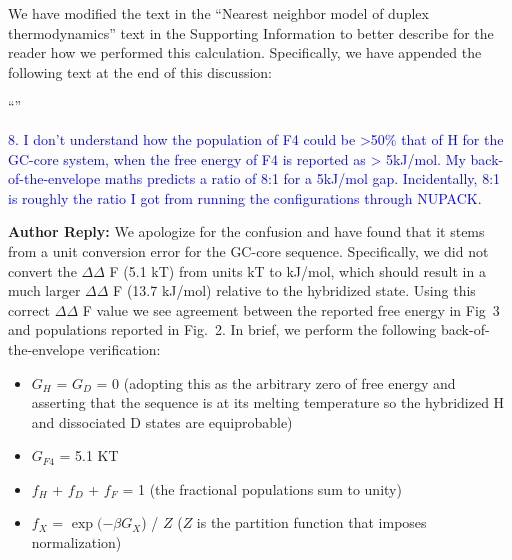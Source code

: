 \documentclass[11pt,a4paper]{letter} %
\newcommand*{\rood}[1]{{\color{red}{#1}}}
\begin{document}
We have modified the text in the ``Nearest neighbor model of duplex thermodynamics'' text in the Supporting Information to better describe for the reader how we performed this calculation. Specifically, we have appended the following text at the end of this discussion:

``\rood{In applying the NN models to each macrostate, we made the simplifying assumption that the ensemble of microstates constituting each macrostate could be represented by a single pattern of Watson-Crick base pairing that are schematically illustrated in Fig.~2a. Indeed, each macrostate is composed of an ensemble of partially frayed states with higher free energy contributions than the intact pattern. However, when averaging across the frayed contributions of all microstates in each macrostate, we have found that incorporating additional NN configurations changes 
$\Delta\Delta$ F values by $<$ 1 kJ/mol when compared to using a single microstate. Given the extent to which a single NN representation captures each macrostate (which is further demonstrated in Fig.~S7), we have elected to maintain a single microstate free energy estimate for each macrostate}''

\textcolor{blue}{8. I don't understand how the population of F4 could be >50\% that of H for the GC-core system, when the free energy of F4 is reported as > 5kJ/mol. My back-of-the-envelope maths predicts a ratio of 8:1 for a 5kJ/mol gap. Incidentally, 8:1 is roughly the ratio I got from running the configurations through NUPACK.}

\textbf{Author Reply:}  We apologize for the confusion and have found that it stems from a unit conversion error for the GC-core sequence. Specifically, we did not convert the $\Delta\Delta$ F (5.1 kT) from units kT to kJ/mol, which should result in a much larger $\Delta\Delta$ F (13.7 kJ/mol) relative to the hybridized state. 
Using this correct $\Delta\Delta$ F value we see agreement between the reported free energy in Fig~3 and populations reported in Fig.~2. In brief, we perform the following back-of-the-envelope verification:

\begin{itemize}
\item $G_H$ = $G_D$ = 0 (adopting this as the arbitrary zero of free energy and asserting that the sequence is at its melting temperature so the hybridized H and dissociated D states are equiprobable)
\item $G_{F4}$ = 5.1 KT
\item $f_H$ + $f_D$ + $f_F$ = 1 (the fractional populations sum to unity)
\item $f_X$ = $\exp (-\beta G_X$) / $Z$ ($Z$ is the partition function that imposes normalization)
\end{itemize}
\end{document}
